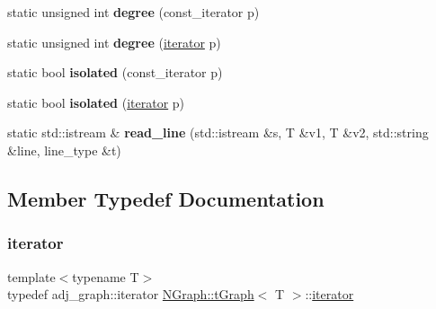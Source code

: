 \begin{DoxyCompactItemize}
\item 
\mbox{\label{class_n_graph_1_1t_graph_a22f2c477b95c7a7bbf4ad117f1905d7c}} 
static unsigned int {\bfseries degree} (const\+\_\+iterator p)
\item 
\mbox{\label{class_n_graph_1_1t_graph_a4325f877a4ae56bdfcac3e47d21c5af4}} 
static unsigned int {\bfseries degree} (\mbox{\hyperlink{class_n_graph_1_1t_graph_a6e446a33b74e5c0c39fb6c50a4f07cec}{iterator}} p)
\item 
\mbox{\label{class_n_graph_1_1t_graph_a5c55e2cba9992aa34e2d2d5d5de43059}} 
static bool {\bfseries isolated} (const\+\_\+iterator p)
\item 
\mbox{\label{class_n_graph_1_1t_graph_a2f28e0205a15e21585a4fcd4515fccff}} 
static bool {\bfseries isolated} (\mbox{\hyperlink{class_n_graph_1_1t_graph_a6e446a33b74e5c0c39fb6c50a4f07cec}{iterator}} p)
\item 
\mbox{\label{class_n_graph_1_1t_graph_ae5f3534e1f30716abf209cede47cff8c}} 
static std\+::istream \& {\bfseries read\+\_\+line} (std\+::istream \&s, T \&v1, T \&v2, std\+::string \&line, line\+\_\+type \&t)
\end{DoxyCompactItemize}


\subsection{Member Typedef Documentation}
\mbox{\label{class_n_graph_1_1t_graph_a6e446a33b74e5c0c39fb6c50a4f07cec}} 
\subsubsection{\texorpdfstring{iterator}{iterator}}
{\footnotesize\ttfamily template$<$typename T$>$ \\
typedef adj\+\_\+graph\+::iterator \mbox{\hyperlink{class_n_graph_1_1t_graph}{N\+Graph\+::t\+Graph}}$<$ T $>$\+::\mbox{\hyperlink{class_n_graph_1_1t_graph_a6e446a33b74e5c0c39fb6c50a4f07cec}{iterator}}}

